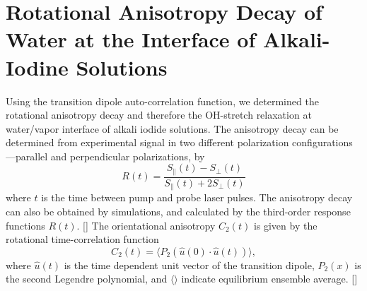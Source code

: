 \FloatBarrier
\section{Rotational Anisotropy Decay of Water at the Interface of Alkali-Iodine Solutions}\label{CHAPETR_AD}
Using the transition dipole auto-correlation function, 
we determined the rotational anisotropy decay and therefore the OH-stretch relaxation at water/vapor interface of alkali iodide solutions.
The anisotropy decay can be determined from experimental signal in two different polarization configurations---parallel and perpendicular polarizations, by 
\begin{equation}
        R(t)=\frac{S_{\parallel}(t)-S_{\perp}(t)}{S_{\parallel}(t)+2S_{\perp}(t)}
\label{eq:ad}
\end{equation}
where $t$ is the time between pump and probe laser pulses.  The anisotropy decay can also be obtained by simulations, and calculated by the third-order response functions $R(t)$. [\cite{Jansen10,Jansen06}]
%
%
The orientational anisotropy $C_2(t)$ is given by the rotational time-correlation function 
\begin{equation}
C_2(t)=\langle P_2(\hat{u}(0)\cdot\hat{u}(t)) \rangle,
\label{eq:tcf2}
\end{equation}
where $\hat{u}(t)$ is the time dependent unit vector of the transition dipole, $P_2(x)$ is the second Legendre polynomial, and $\langle \rangle$ indicate 
equilibrium ensemble average. [\cite{Corcelli05,LinYS2010}] %

